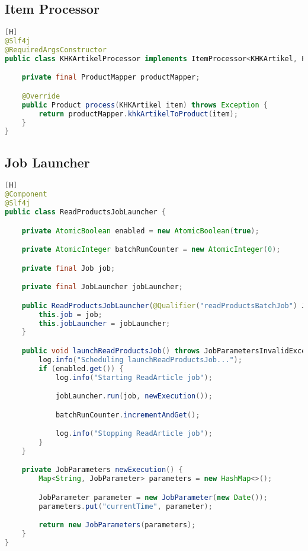 \subsection{Item Processor}
\begin{lstlisting}[language=JAVA,caption=KHKArtikelProcessor.java][H]
@Slf4j
@RequiredArgsConstructor
public class KHKArtikelProcessor implements ItemProcessor<KHKArtikel, Product> {

    private final ProductMapper productMapper;

    @Override
    public Product process(KHKArtikel item) throws Exception {
        return productMapper.khkArtikelToProduct(item);
    }
}
\end{lstlisting}

\subsection{Job Launcher}
\begin{lstlisting}[language=JAVA,caption=ReadProductsJobLauncher.java][H]
@Component
@Slf4j
public class ReadProductsJobLauncher {

    private AtomicBoolean enabled = new AtomicBoolean(true);

    private AtomicInteger batchRunCounter = new AtomicInteger(0);

    private final Job job;

    private final JobLauncher jobLauncher;

    public ReadProductsJobLauncher(@Qualifier("readProductsBatchJob") Job job, JobLauncher jobLauncher) {
        this.job = job;
        this.jobLauncher = jobLauncher;
    }

    public void launchReadProductsJob() throws JobParametersInvalidException, JobExecutionAlreadyRunningException, JobRestartException, JobInstanceAlreadyCompleteException {
        log.info("Scheduling launchReadProductsJob...");
        if (enabled.get()) {
            log.info("Starting ReadArticle job");

            jobLauncher.run(job, newExecution());

            batchRunCounter.incrementAndGet();

            log.info("Stopping ReadArticle job");
        }
    }

    private JobParameters newExecution() {
        Map<String, JobParameter> parameters = new HashMap<>();

        JobParameter parameter = new JobParameter(new Date());
        parameters.put("currentTime", parameter);

        return new JobParameters(parameters);
    }
}
\end{lstlisting}

